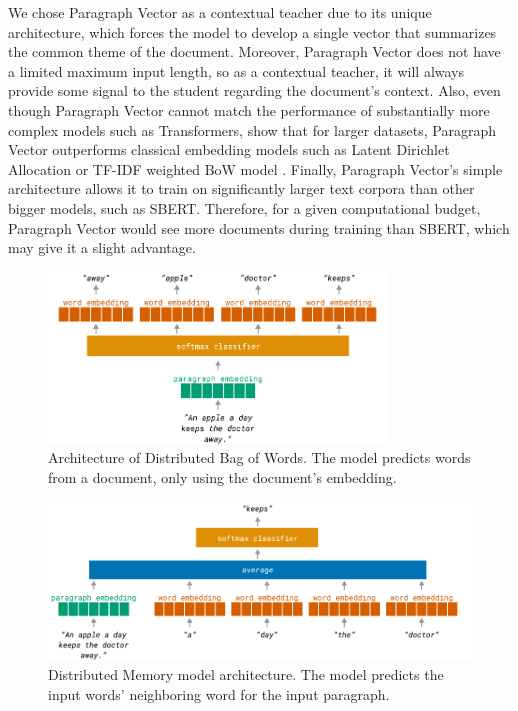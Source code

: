 We chose Paragraph Vector as a contextual teacher due to its unique
architecture, which forces the model to develop a single vector that summarizes
the common theme of the document. Moreover, Paragraph Vector does not have a
limited maximum input length, so as a contextual teacher, it will always
provide some signal to the student regarding the document's context. Also, even
though Paragraph Vector cannot match the performance of substantially more
complex models such as Transformers, \cite{dai2015document} show that for
larger datasets, Paragraph Vector outperforms classical embedding models such
as Latent Dirichlet Allocation \citep{blei2003latent} or TF-IDF weighted BoW
model \citep{harris1954distributional}. Finally, Paragraph Vector's simple
architecture allows it to train on significantly larger text corpora than other
bigger models, such as SBERT. Therefore, for a given computational budget,
Paragraph Vector would see more documents during training than SBERT, which may
give it a slight advantage.

\begin{figure}
  \centering
  \includegraphics[width=0.8\textwidth]{./img/dbow_architecture.pdf}

  \caption{Architecture of Distributed Bag of Words. The model predicts words
  from a document, only using the document's embedding.}

  \label{fig:dbow}
\end{figure}

\begin{figure}
  \centering
  \includegraphics[width=1\textwidth]{./img/dm_architecture.pdf}

  \caption{Distributed Memory model architecture. The model predicts the input
  words' neighboring word for the input paragraph.}

  \label{fig:dm}

\end{figure}

